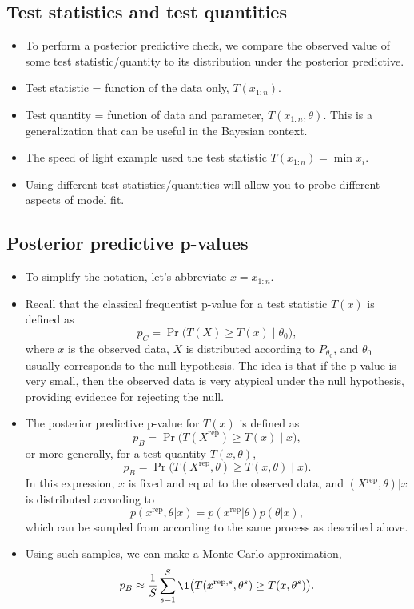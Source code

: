 \documentclass[12pt]{article}
\newcommand{\rep}{\text{rep}}
\begin{document}
\subsection*{Test statistics and test quantities}
\begin{itemize}
\item To perform a posterior predictive check, we compare the observed value of some test statistic/quantity to its distribution under the posterior predictive.
\item Test statistic = function of the data only, $T(x_{1:n})$.
\item Test quantity = function of data and parameter, $T(x_{1:n},\theta)$. This is a generalization that can be useful in the Bayesian context.
\item The speed of light example used the test statistic $T(x_{1:n}) = \min x_i$. 
\item Using different test statistics/quantities will allow you to probe different aspects of model fit.
\end{itemize}

\subsection*{Posterior predictive p-values}
\begin{itemize}
\item To simplify the notation, let's abbreviate $x = x_{1:n}$.
\item Recall that the classical frequentist p-value for a test statistic $T(x)$ is defined as
$$p_C = \Pr\big(T(X)\geq T(x) \mid \theta_0 \big),$$
where $x$ is the observed data, $X$ is distributed according to $P_{\theta_0}$, and $\theta_0$ usually corresponds to the null hypothesis. The idea is that if the p-value is very small, then the observed data is very atypical under the null hypothesis, providing evidence for rejecting the null.
\item The posterior predictive p-value for $T(x)$ is defined as
$$p_B = \Pr\big(T(X^\rep)\geq T(x) \mid x \big),$$
or more generally, for a test quantity $T(x,\theta)$,
$$p_B = \Pr\big(T(X^\rep,\theta)\geq T(x,\theta) \mid x \big).$$
In this expression, $x$ is fixed and equal to the observed data, and $(X^\rep,\theta) | x$ is distributed according to 
$$p(x^\rep,\theta | x) = p(x^\rep | \theta) p(\theta | x), $$
which can be sampled from according to the same process as described above.
\item Using such samples, we can make a Monte Carlo approximation,
$$ p_B \approx \frac{1}{S}\sum_{s = 1}^S \1 \big(T(x^{\rep,s},\theta^s)\geq T(x,\theta^s) \big). $$
\end{itemize}
\end{document}
